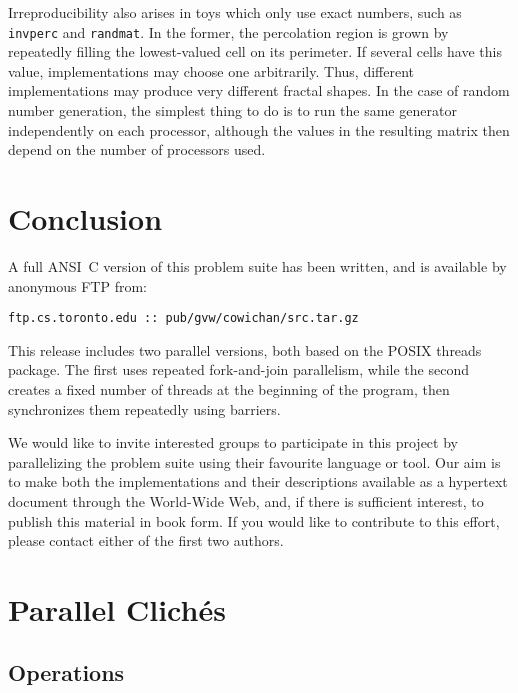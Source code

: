 Irreproducibility also arises in toys which only use exact numbers, such as {\tt{invperc}} and {\tt{randmat}}.
In the former, the percolation region is grown by repeatedly filling the lowest-valued cell on its perimeter.
If several cells have this value, implementations may choose one arbitrarily.
Thus, different implementations may produce very different fractal shapes.
In the case of random number generation, the simplest thing to do is to run the same generator independently on each processor,
although the values in the resulting matrix then depend on the number of processors used.

\section{Conclusion\label{s:conclude}}

A full ANSI~C version of this problem suite has been written, and is available by anonymous FTP from:
\begin{center}
{\tt{ftp.cs.toronto.edu :: pub/gvw/cowichan/src.tar.gz}}
\end{center}
This release includes two parallel versions,
both based on the POSIX threads package.
The first uses repeated fork-and-join parallelism,
while the second creates a fixed number of threads at the beginning of the program,
then synchronizes them repeatedly using barriers.

We would like to invite interested groups to participate in this project by parallelizing the problem suite using their favourite language or tool.
Our aim is to make both the implementations and their descriptions available as a hypertext document through the World-Wide Web,
and, if there is sufficient interest, to publish this material in book form.
If you would like to contribute to this effort, please contact either of the first two authors.


\newcommand{\bibea}{{\em{et~al.}}}
\begin{small}

\end{small}

\appendix

\newpage
\section{Parallel Clich\'{e}s\label{s:cliche}}

\subsection{Operations\label{s:cliche-ops}}

